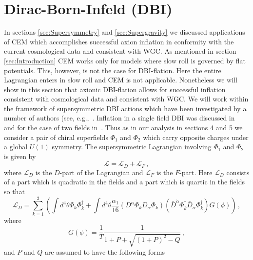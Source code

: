 \documentclass[12pt]{article}
\begin{document}
\section{Dirac-Born-Infeld (DBI) \label{sec:DBI}}
In sections \ref{sec:Supersymmetry} and \ref{sec:Supergravity} we discussed applications of CEM which accomplishes successful axion inflation in conformity with the current cosmological data and consistent with WGC.
As mentioned in section \ref{sec:Introduction} CEM works only for models where slow roll is governed by flat potentials.
This, however, is not the case for DBI-flation.
Here the entire Lagrangian enters in slow roll and CEM is not applicable.
Nonetheless we will show in this section that axionic DBI-flation allows for successful inflation consistent with cosmological data and consistent with WGC.
We will work within the framework of supersymmetric DBI actions which have been investigated by a number of authors (see, e.g.,~\cite{Nath:2018xxe, Khoury:2010gb, Khoury:2011da, Baumann:2011nk, Baumann:2011nm, Rocek:1997hi, Tseytlin:1999dj, Ito:2007hy, Billo:2008sp, Sasaki:2012ka, Aoki:2016tod}.
Inflation in a single field DBI was discussed in~\cite{Sasaki:2012ka} and for the case of two fields in~\cite{Nath:2018xxe}.
Thus as in our analysis in sections 4 and 5 we consider a pair of chiral superfields $\Phi_1$ and $\Phi_2$ which carry opposite charges under a global $U\left(1\right)$ symmetry.
The supersymmetric Lagrangian involving $\Phi_1$ and $\Phi_2$ is given by
\begin{equation} \label{eq:DBI:lagrangianTerms}
  \mathcal{L} = \mathcal{L}_D + \mathcal{L}_F\,,
\end{equation}
where $\mathcal{L}_D$ is the $D$-part of the Lagrangian and $\mathcal{L}_F$ is the $F$-part.
Here $\mathcal{L}_D$ consists of a part which is quadratic in the fields and a part which is quartic in the fields so that
\begin{equation} \label{eq:DBI:lagrangianD}
  \mathcal{L}_D = \sum_{k = 1}^2 \left(\int d^4 \theta \Phi_k \Phi_k^\dagger
    + \int d^4 \theta \frac{\alpha_1}{16}
      \left(D^\alpha \Phi_k D_\alpha \Phi_k\right)
      \left({\bar D}^{\dot\alpha} \Phi_k^\dagger {\bar D}_{\dot\alpha} \Phi_k^\dagger\right)
      G\left(\phi\right)\right)\,,
\end{equation}
where
\begin{equation}
  G\left(\phi\right) = \frac{1}{T} \frac{1}{1 + P + \sqrt{\left(1 + P\right)^2 - Q}}\,,
\end{equation}
and $P$ and $Q$ are assumed to have the following forms
\end{document}
